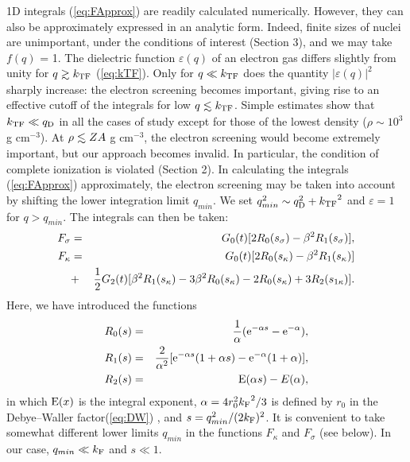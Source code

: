 1D integrals (\ref{eq:FApprox}) are readily calculated numerically. 
However, they can also be approximately expressed in an analytic form.
Indeed, finite sizes of nuclei are unimportant, 
under the conditions of interest (Section 3), and we may take
$f(q)$ = 1. The dielectric function $\varepsilon(q)$ of an
electron gas differs slightly from unity for $q \ga \kTF$ (\ref{eq:kTF}). 
Only for $q \ll \mbox{$k_{\rm TF}$}$ does the quantity $|\varepsilon(q)|^2$ sharply
increase: the electron screening becomes important, giving 
rise to an effective cutoff of the integrals for low $q \la \kTF$. 
Simple estimates show that $\mbox{$k_{\rm TF}$} \ll q_{\rm D}$ in all the cases
of study except for those of the lowest density ($\rho \sim 
10^3$  g cm$^{-3}$). At $\rho \la ZA$  g cm$^{-3}$, the electron
screening would become extremely important, but our approach
becomes invalid. In particular, the condition of complete ionization 
is violated (Section 2). In calculating the integrals (\ref{eq:FApprox})
approximately, the electron screening may be taken into account by 
shifting the lower integration limit $q_{min}$. 
We set $q_{min}^2 \sim q_{\rm D}^2 + \mbox{$k_{\rm TF}$}^2$ and $\varepsilon = 1$ 
for $q> q_{min}$. The integrals can then be taken:
%
\begin{eqnarray}
     F_\sigma & = & G_0(t)[2R_0(s_\sigma)- \beta^2R_1(s_\sigma)],
\label{eq:Fsigma} \\
    F_\kappa & = & G_0(t)[2R_0(s_\kappa)- \beta^2 R_1(s_\kappa)]
\nonumber \\
             & + & {1 \over 2} G_2(t)
                   [\beta^2 R_1(s_\kappa) - 3 \beta^2 R_0(s_\kappa)
                    -2R_0(s_\kappa)+3R_2(s_{1\kappa})].
\label{eq:Fkappa}
\end{eqnarray}
%
Here, we have introduced the functions
%
\begin{eqnarray}
    R_0(s) & = & {1 \over \alpha}
                 ( {\rm e}^{-\alpha s} - {\rm e}^{-\alpha}),
\nonumber \\
    R_1(s) & = & {2 \over \alpha^2}
           [{\rm e}^{-\alpha s}(1+ \alpha s) -
           {\rm e}^{-\alpha}(1+\alpha)],
\nonumber \\
    R_2(s) & = & {\rm E}(\alpha s) - E(\alpha),
\label{eq:R}
\end{eqnarray}
%
in which ${\rm E}(x)$ is the integral exponent, $\alpha=4r_0^2 \mbox{$k_{\rm F}$}^2/3$ 
is defined by $r_0$ in the Debye--Waller factor(\ref{eq:DW}) , 
and $s= q_{min}^2/(2 \mbox{$k_{\rm F}$})^2$.  It is convenient to take somewhat
different lower limits $q_{min}$ in the functions $F_\kappa$ and $F_\sigma$ 
(see below). In our case, $q_{min} \ll \mbox{$k_{\rm F}$}$ and $s \ll 1$. 
